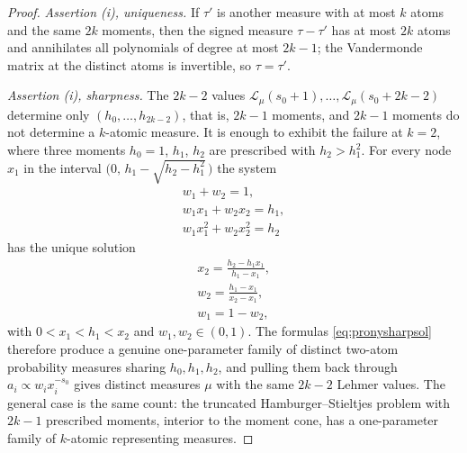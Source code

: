 \documentclass[sn-mathphys-num]{sn-jnl}
\theoremstyle{thmstyleone}%
\theoremstyle{thmstyletwo}%
\theoremstyle{thmstylethree}%
\theoremstyle{thmstyleone}%
\providecommand{\Leh}{\mathscr{L}}
\begin{document}
\begin{appendices}
\begin{proof}
			\emph{Assertion (i), uniqueness.} If $\tau'$ is another measure
			with at most $k$ atoms and the same $2k$ moments, then the
			signed measure $\tau-\tau'$ has at most $2k$ atoms and
			annihilates all polynomials of degree at most $2k-1$; the
			Vandermonde matrix at the distinct atoms is invertible, so
			$\tau=\tau'$.
			
			\emph{Assertion (i), sharpness.} The $2k-2$ values
			$\Leh_\mu(s_0+1),\dots,\Leh_\mu(s_0+2k-2)$ determine only
			$(h_0,\dots,h_{2k-2})$, that is, $2k-1$ moments, and $2k-1$
			moments do not determine a $k$-atomic measure. It is enough to
			exhibit the failure at $k=2$, where three moments
			$h_0=1$, $h_1$, $h_2$ are prescribed with $h_2>h_1^{2}$. For
			every node $x_1$ in the interval
			$\bigl(0,\,h_1-\sqrt{h_2-h_1^{2}}\,\bigr)$ the system
			\begin{equation}\label{eq:pronysharp}
				\begin{gathered}
					w_1+w_2=1,\\
					w_1x_1+w_2x_2=h_1,\\
					w_1x_1^{2}+w_2x_2^{2}=h_2
				\end{gathered}
			\end{equation}
			has the unique solution
			\begin{equation}\label{eq:pronysharpsol}
				\begin{gathered}
					x_2=\frac{h_2-h_1x_1}{h_1-x_1},\\
					w_2=\frac{h_1-x_1}{x_2-x_1},\\
					w_1=1-w_2,
				\end{gathered}
			\end{equation}
			with $0<x_1<h_1<x_2$ and $w_1,w_2\in(0,1)$. The
			formulas \eqref{eq:pronysharpsol} therefore produce a genuine
			one-parameter family of distinct two-atom probability measures
			sharing $h_0,h_1,h_2$, and pulling them back through
			$a_i\propto w_ix_i^{-s_0}$ gives distinct measures $\mu$ with
			the same $2k-2$ Lehmer values. The general case is the same
			count: the truncated Hamburger--Stieltjes problem with $2k-1$
			prescribed moments, interior to the moment cone, has a
			one-parameter family of $k$-atomic representing measures.
			

\end{proof}
\end{appendices}
\end{document}
